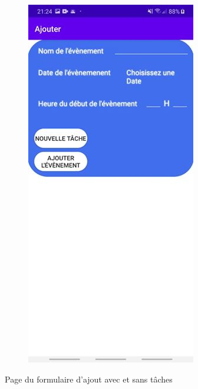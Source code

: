 \documentclass[12pt,a4paper]{report}
\begin{document}
\begin{flushleft}
\begin{figure}
    \begin{subfigure}[b]{0.3\textwidth}
        \includegraphics[width=\textwidth]{FormNoTask}
    \end{subfigure}
    \caption{Page du formulaire d'ajout avec et sans tâches}
\end{figure}
\end{flushleft}
\newpage
\end{document}
